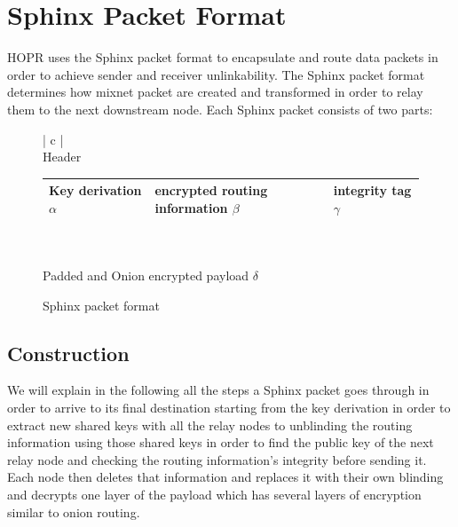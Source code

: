 \section{Sphinx Packet Format}

HOPR uses the Sphinx packet format \cite{sphinxpaper} to encapsulate and route
data packets in order to achieve sender and receiver unlinkability. The Sphinx
packet format determines how mixnet packet are created and transformed in order
to relay them to the next downstream node. Each Sphinx packet consists of two
parts:

\begin{figure}[H]
    \centering
    \begin{tabular}{| c |}
        \hline
        \\[-0.8em]
        Header                                       \\[0.2em]
        \begin{tabular}{| m{} | m{} | m{} |}
            \hline
            Key derivation $\alpha$ & encrypted routing information $\beta$ & integrity tag $\gamma$ \\
            \hline
        \end{tabular}                    \\[0.9em]
        \hline
        \hline
        \\[-0.7em]
        Padded and Onion encrypted payload  $\delta$ \\[0.7em]
        \hline
    \end{tabular}
    \label{fig:Sphinx packet format}
    \caption{Sphinx packet format}
\end{figure}

\subsection{Construction}

We will explain in the following all the steps a Sphinx packet goes through in
order to arrive to its final destination starting from the key derivation in
order to extract new shared keys with all the relay nodes to unblinding the
routing information using those shared keys in order to find the public key of
the next relay node and checking the routing information's integrity before
sending it. Each node then deletes that information and replaces it with their
own blinding and decrypts one layer of the payload which has several layers of
encryption similar to onion routing.


